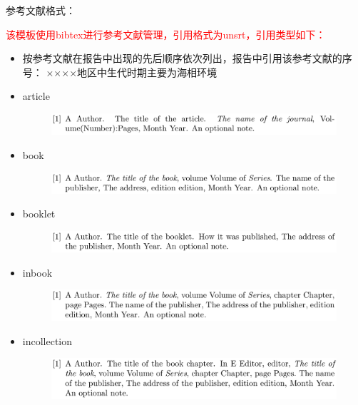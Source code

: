 \documentclass{fieldpractice-geo}
\begin{document}
参考文献格式：

 \textcolor{red}{该模板使用bibtex进行参考文献管理，引用格式为unsrt，引用类型如下：}
\begin{itemize}
	\item 按参考文献在报告中出现的先后顺序依次列出，报告中引用该参考文献的序号：
	××××地区中生代时期主要为海相环境\cite{地质学基础}
	\item article
	\begin{figure}[H]
		\centering
		\includegraphics[width=1\textwidth]{example-figures/article.png}
		\caption*{}
	\end{figure}
	\item book 
	\begin{figure}[H]
	\centering
	\includegraphics[width=1\textwidth]{example-figures/book.png}
	\caption*{}
	\end{figure}
	\item booklet
	\begin{figure}[H]
	\centering
	\includegraphics[width=1\textwidth]{example-figures/booklet.png}
	\caption*{}
	\end{figure}
	\item inbook
	\begin{figure}[H]
		\centering
		\includegraphics[width=1\textwidth]{example-figures/inbook.png}
		\caption*{}
	\end{figure}
	\item incollection
	\begin{figure}[H]
		\centering
		\includegraphics[width=1\textwidth]{example-figures/incollection.png}
		\caption*{}
	\end{figure}

\end{itemize}
\end{document}
